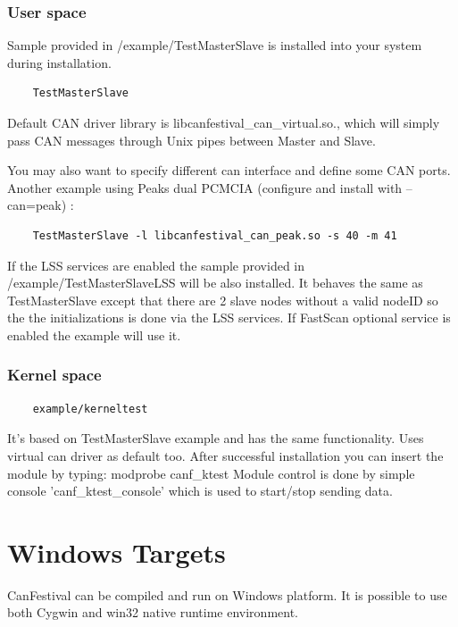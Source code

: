 \documentclass[12pt,english,a4paper]{book}
\begin{document}
\subsubsection{User space}

Sample provided in /example/TestMasterSlave is installed into your
system during installation.


\begin{verbatim}
	TestMasterSlave
\end{verbatim}


Default CAN driver library is libcanfestival\_can\_virtual.so., which
will simply pass CAN messages through Unix pipes between Master and
Slave.

You may also want to specify different can interface and define some
CAN ports. Another example using Peak{\textquotesingle}s dual PCMCIA
(configure and install with --can=peak) :


\begin{verbatim}
	TestMasterSlave -l libcanfestival_can_peak.so -s 40 -m 41
\end{verbatim}

If the LSS services are enabled the sample provided in /example/TestMasterSlaveLSS will be also installed. It behaves the same as TestMasterSlave except that there are 2 slave nodes without a valid nodeID so the the initializations is done via  the LSS services. If FastScan optional service is enabled the example will use it. 

\subsubsection{Kernel space}


\begin{verbatim}
	example/kerneltest
\end{verbatim}


It's based on TestMasterSlave example
and has the same functionality. Uses virtual can driver as default
too. After successful installation you can insert the module by typing:
modprobe canf\_ktest Module control is done by simple console 'canf\_ktest\_console'
which is used to start/stop sending data.


\section{Windows Targets}

CanFestival can be compiled and run on Windows platform. It is possible
to use both Cygwin and win32 native runtime environment.
\end{document}
